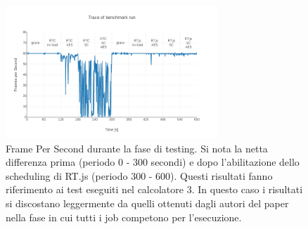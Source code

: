 \documentclass[conference]{IEEEtran}
\begin{document}
    \begin{figure}[hbt!]
    \includegraphics[width=8cm]{qualitative_3.png}
    \centering
    \caption{Frame Per Second durante la fase di testing. Si nota la netta differenza prima (periodo 0 - 300 secondi) e dopo l’abilitazione dello scheduling di RT.js (periodo 300 - 600). Questi risultati fanno riferimento ai test eseguiti nel calcolatore 3. In questo caso i risultati si discostano leggermente da quelli ottenuti dagli autori del paper nella fase in cui tutti i job competono per l'esecuzione.}
    \end{figure}
    
\end{document}
